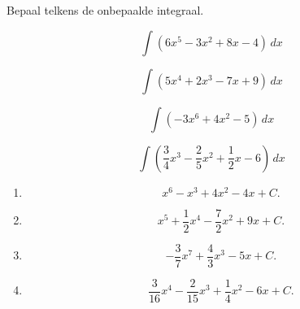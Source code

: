 \documentclass{ximera}
\begin{document}
\begin{oefening}{\oefB}

Bepaal telkens de onbepaalde integraal.

\begin{question}
\[
\int (6x^5-3x^2+8x-4)\,dx
\]
\end{question}

\begin{question}
\[
\int (5x^4+2x^3-7x+9)\,dx
\]
\end{question}

\begin{question}
\[
\int (-3x^6+4x^2-5)\,dx
\]
\end{question}

\begin{question}
\[
\int \left(\frac34x^3-\frac25x^2+\frac12x-6\right)\,dx
\]
\end{question}

\begin{oplossing}

\begin{enumerate}
\item
\[
x^6-x^3+4x^2-4x+C.
\]
\item
\[
x^5+\frac12x^4-\frac72x^2+9x+C.
\]
\item
\[
-\frac37x^7+\frac43x^3-5x+C.
\]
\item
\[
\frac{3}{16}x^4-\frac{2}{15}x^3+\frac14x^2-6x+C.
\]
\end{enumerate}

\end{oplossing}

\end{oefening}


\end{document}
